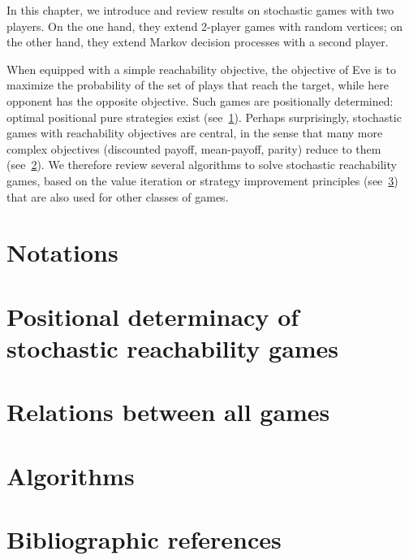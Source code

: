 

In this chapter, we introduce and review results on stochastic games
with two players. On the one hand, they extend 2-player games with
random vertices; on the other hand, they extend Markov decision
processes with a second player. 

When equipped with a simple reachability objective, the objective of
Eve is to maximize the probability of the set of plays that reach the
target, while here opponent has the opposite objective. Such games are
positionally determined: optimal positional pure strategies exist (see~\cref{6-sec:determinacy}). 
Perhaps surprisingly, stochastic games
with reachability objectives are central, in the sense that many more
complex objectives (discounted payoff, mean-payoff, parity) reduce to
them (see~\cref{6-sec:relations}). We therefore review several
algorithms to solve stochastic reachability games, based on the value
iteration or strategy improvement principles (see~\cref{6-sec:algos}) that are also used for other classes of
games.

\section*{Notations}
\label{6-sec:notations}


\section{Positional determinacy of stochastic reachability games}
\label{6-sec:determinacy}


\section{Relations between all games}
\label{6-sec:relations}


\section{Algorithms}
\label{6-sec:algos}


\section*{Bibliographic references}
\label{6-sec:references}

